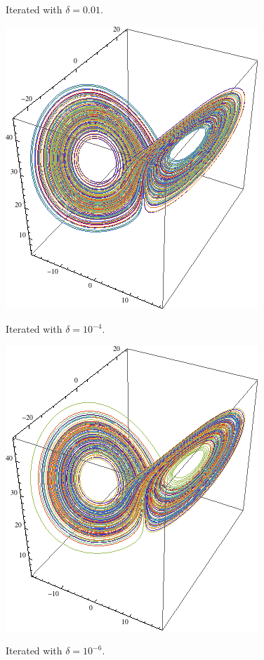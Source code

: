 \documentclass[letterpaper,10pt]{article}
\begin{document}
\begin{description}
\begin{center}
\end{center}
Iterated with $\delta=0.01$.
\begin{center}
  \includegraphics[scale=0.5]{images/lorenz2.png}
\end{center}
Iterated with $\delta=10^{-4}$.
\begin{center}
  \includegraphics[scale=0.5]{images/lorenz3.png}
\end{center}
Iterated with $\delta=10^{-6}$.
\begin{center}

\end{center}
\end{description}
\end{document}
